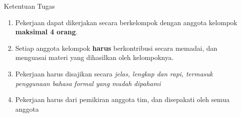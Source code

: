 \documentclass[a4paper,11pt]{article}
\begin{document}
\begin{infobox}{Ketentuan Tugas}
\begin{enumerate}
    \itemsep0em
     \item Pekerjaan dapat dikerjakan secara berkelompok dengan anggota kelompok \textbf{maksimal 4 orang}.
     \item Setiap anggota kelompok \textbf{harus} berkontribusi secara memadai, dan menguasai materi yang dihasilkan oleh kelompoknya.
     \item Pekerjaan harus disajikan secara \textit{jelas, lengkap dan rapi, termasuk penggunaan bahasa formal yang mudah dipahami}
     \item Pekerjaan harus dari pemikiran anggota tim, dan disepakati oleh semua anggota
\end{enumerate}  
\end{infobox}
\end{document}
